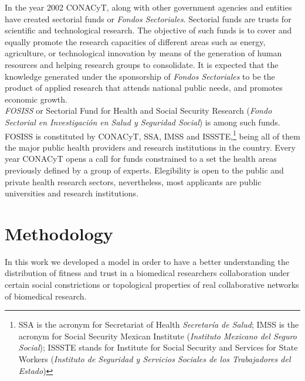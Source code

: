 In the year 2002 CONACyT, along with other government agencies and
entities have created sectorial funds or \emph{Fondos Sectoriales}.
Sectorial funds are trusts for scientific and technological research.
The objective of such funds is to cover and equally promote the
research capacities of different areas such as energy, agriculture, or
technological innovation by means of the generation of human resources
and helping research groups to consolidate. It is expected that the
knowledge generated under the sponsorship of \emph{Fondos Sectoriales}
to be the product of applied research that attends national public
needs, and promotes economic growth.\\

\emph{FOSISS} or Sectorial Fund for Health and Social Security
Research (\emph{Fondo Sectorial en Investigaci\'on en Salud y
  Seguridad Social}) is among such funds. FOSISS is constituted by
CONACyT, SSA, IMSS and ISSSTE,\footnote{SSA is the acronym for
  Secretariat of Health \emph{Secretar\'ia de Salud}; IMSS is the
  acronym for Social Security Mexican Institute (\emph{Instituto
    Mexicano del Seguro Social}); ISSSTE stands for Institute for
  Social Security and Services for State Workers (\emph{Instituto de
    Seguridad y Servicios Sociales de los Trabajadores del Estado})}
being all of them the major public health providers and research
institutions in the country. Every year CONACyT opens a call for funds
constrained to a set the health areas previously defined by a group of
experts. Elegibility is open to the public and private health research
sectors, nevertheless, most applicants are public universities and
research institutions.  

\section{Methodology}
\label{sec:2}
In this work we developed a model in order to have a better
understanding the distribution of fitness and trust in a biomedical
researchers collaboration under certain social constrictions or
topological properties of real collaborative networks of biomedical
research.\\

